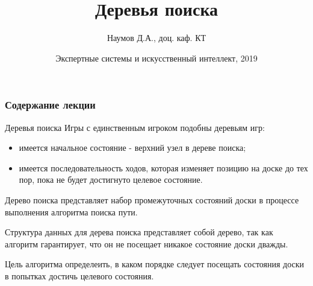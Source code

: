 \documentclass{beamer}
\title[Artifical Intelligence]{Деревья поиска}
\author{Наумов Д.А., доц. каф. КТ}
\date[05.11.2019] {Экспертные системы и искусственный интеллект, 2019}
\begin{document}
\begin{frame}
  \titlepage
\end{frame}
  
\begin{frame}
  \frametitle{Содержание лекции}
  \tableofcontents  
\end{frame}

\begin{frame}{Деревья поиска}
Игры с единственным игроком подобны деревьям игр:
\begin{itemize}
\item имеется начальное состояние - верхний узел в дереве поиска;
\item имеется последовательность ходов, которая изменяет позицию на доске до тех пор, пока не будет достигнуто целевое состояние. 
\end{itemize} 
\begin{block}{Дерево поиска}
представляет набор промежуточных состояний доски в процессе выполнения
алгоритма поиска пути. 
\end{block}
\begin{block}{Структура данных для дерева поиска}
представляет собой дерево, так как алгоритм гарантирует, что он не посещает никакое состояние доски дважды. 
\end{block}
\begin{block}{Цель алгоритма}
определеить, в каком порядке следует посещать состояния доски в попытках достичь целевого состояния.
\end{block}
\end{frame}
\end{document}
